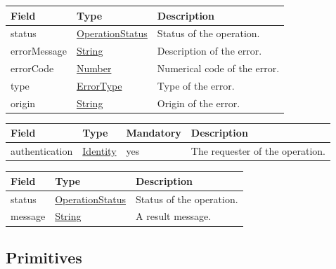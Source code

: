 \documentclass[a4paper]{arrowhead}
\newcommand{\pref}[1]{{\textcolor{ArrowheadGrey}{\hyperref[sec:model:primitives:#1]{#1}}}}
\begin{document}

\begin{table}[ht!]
\begin{tabularx}{\textwidth}{| p{4.25cm} | p{3.5cm} | X |} \hline
\rowcolor{gray!33} Field & Type      & Description \\ \hline
status & \pref{OperationStatus} & Status of the operation. \\ \hline
errorMessage & \pref{String} & Description of the error. \\ \hline
errorCode &\pref{Number}  & Numerical code of the error. \\ \hline
type & \pref{ErrorType} & Type of the error. \\ \hline
origin & \pref{String} & Origin of the error. \\ \hline
\end{tabularx}
\end{table}

\clearpage


\begin{table}[ht!]
\begin{tabularx}{\textwidth}{| p{3cm} | p{5.5cm} | p{2cm} | X |} \hline
\rowcolor{gray!33} Field & Type & Mandatory & Description \\ \hline
authentication & \hyperref[sec:model:Identity]{Identity} & yes & The requester of the operation. \\ \hline
\end{tabularx}
\end{table}


\begin{table}[ht!]
\begin{tabularx}{\textwidth}{| p{4.25cm} | p{3.5cm} | X |} \hline
\rowcolor{gray!33} Field & Type      & Description \\ \hline
status & \pref{OperationStatus} & Status of the operation. \\ \hline
message & \pref{String} & A result message. \\ \hline
\end{tabularx}
\end{table}

\subsection{Primitives}
\label{sec:model:primitives}
\end{document}
